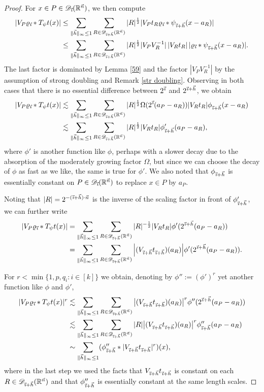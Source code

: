 \documentclass[11pt, reqno]{amsart}
\theoremstyle{definition}
\theoremstyle{remark}
\numberwithin{equation}{section}
\newcommand{\D}{\mathscr D}
\newcommand{\R}{\mathbb R}
\newcommand{\vh}{\vec h}
\newcommand{\vi}{\vec{\textit{\i}}}
\newcommand{\vn}{\vec n}
\newcommand{\abs}[1]{|#1|}
\newcommand{\Norm}[2]{\|#1\|_{#2}}
\begin{document}
\begin{proof}
For $x\in P\in\D_{\vi}(\R^{\vn})$, we then compute
\begin{align*}
\abs{V_P\varrho_{\vi}*T_\psi t(x)}
&\leq\sum_{\Norm{\vh}{\infty}\leq 1}\sum_{R\in\D_{\vi+\vh}(\R^{\vn})} \abs{R}^{\frac 12} \abs{V_Pt_R\varrho_{\vi}*\psi_{\vi+\vh}(x-a_R)} \\
&\leq\sum_{\Norm{\vh}{\infty}\leq 1} \sum_{R\in\D_{\vi+\vh}(\R^{\vn})} \abs{R}^{\frac 12} |V_PV_R^{-1}|\,
\abs{V_R t_R} \, |\varrho_{\vi}*\psi_{\vi+\vh}(x-a_R)|.
\end{align*}
The last factor is dominated by Lemma \ref{59} and
the factor $\abs{V_P V_R^{-1}}$ by the assumption of
strong doubling and Remark \ref{str doubling}.
Observing in both cases that there is no essential difference between $2^{\vi}$ and $2^{\vi+\vh}$, we obtain
\begin{align*}
\abs{V_P\varrho_{\vi}*T_\psi t(x)}
&\lesssim \sum_{\Norm{\vh}{\infty}\leq 1} \sum_{R\in\D_{\vi+\vh}(\R^{\vn})}
\abs{R}^{\frac 12}
\Omega(2^{\vi}(a_P-a_R)) \abs{V_R t_R} \phi_{\vi+\vh}(x-a_R) \\
&\lesssim\sum_{\Norm{\vh}{\infty}\leq 1}\sum_{R\in\D_{\vi+\vh}(\R^{\vn})}\abs{R}^{\frac 12}
\abs{V_R t_R}\phi_{\vi+\vh}'(a_P-a_R),
\end{align*}
where $\phi'$ is another function like $\phi$, perhaps with a slower decay due to the absorption of the moderately growing factor $\Omega$, but since we can choose the decay of $\phi$ as fast as we like, the same is true for $\phi'$. We also noted that $\phi_{\vi+\vh}$ is essentially constant on $P\in\D_{\vi}(\R^{\vn})$ to replace $x\in P$ by $a_P$.

Noting that $\abs{R}=2^{-(\vi+\vh)\cdot\vn}$ is the inverse of the scaling factor in front of $\phi_{\vi+\vh}'$, we can further write
\begin{align*}
\abs{V_P\varrho_{\vi}*T_\psi t(x)}
&=\sum_{\Norm{\vh}{\infty}\leq 1}\sum_{R\in\D_{\vi+\vh}(\R^{\vn})}
\abs{R}^{-\frac 12} \abs{V_R t_R} \phi'(2^{\vi+\vh}(a_P-a_R)) \\
&=\sum_{\Norm{\vh}{\infty}\leq 1}\sum_{R\in\D_{\vi+\vh}(\R^{\vn})}
\Big| (V_{\vi+\vh}t_{\vi+\vh})(a_R) \Big|
\phi'(2^{\vi+\vh}(a_P-a_R)).
\end{align*}

For $r<\min\{1,p,q_i:i\in[k]\}$ we obtain, denoting by $\phi'':=(\phi')^r$ yet another function like $\phi$ and $\phi'$,
\begin{align*}
\abs{V_P\varrho_{\vi}*T_\psi t(x)}^r
&\lesssim\sum_{\Norm{\vh}{\infty}\leq 1}\sum_{R\in\D_{\vi+\vh}(\R^{\vn})}
\big|(V_{\vi+\vh}t_{\vi+\vh})(a_R)\big|^r \phi''(2^{\vi+\vh}(a_P-a_R)) \\
&\lesssim\sum_{\Norm{\vh}{\infty}\leq 1}\sum_{R\in\D_{\vi+\vh}(\R^{\vn})}\abs{R}
\big|(V_{\vi+\vh}t_{\vi+\vh})(a_R)\big|^r \phi''_{\vi+\vh}(a_P-a_R) \\
&\sim\sum_{\Norm{\vh}{\infty}\leq 1}(\phi_{\vi+\vh}''*\abs{V_{\vi+\vh}t_{\vi+\vh}}^r)(x),
\end{align*}
where in the last step we used the facts that $V_{\vi+\vh}t_{\vi+\vh}$ is constant on each $R\in\D_{\vi+\vh}(\R^{\vn})$ and that $\phi_{\vi+\vh}''$ is essentially constant at the same length scales.


\end{proof}
\end{document}

